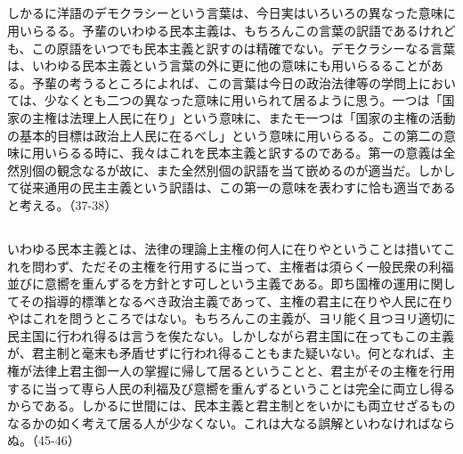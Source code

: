\subsection{}



しかるに洋語のデモクラシーという言葉は、今日実はいろいろの異なった意味に用いらるる。予輩のいわゆる民本主義は、もちろんこの言葉の訳語であるけれども、この原語をいつでも民本主義と訳すのは精確でない。デモクラシーなる言葉は、いわゆる民本主義という言葉の外に更に他の意味にも用いらるることがある。予輩の考うるところによれば、この言葉は今日の政治法律等の学問上においては、少なくとも二つの異なった意味に用いられて居るように思う。一つは「国家の主権は法理上人民に在り」という意味に、またモ一つは「国家の主権の活動の基本的目標は政治上人民に在るべし」という意味に用いらるる。この第二の意味に用いらるる時に、我々はこれを民本主義と訳するのである。第一の意義は全然別個の観念なるが故に、また全然別個の訳語を当て嵌めるのが適当だ。しかして従来通用の民主主義という訳語は、この第一の意味を表わすに恰も適当であると考える。（37-38）

\subsection{}

いわゆる民本主義とは、法律の理論上主権の何人に在りやということは措いてこれを問わず、ただその主権を行用するに当って、主権者は須らく一般民衆の利福並びに意嚮を重んずるを方針とす可しという主義である。即ち国権の運用に関してその指導的標準となるべき政治主義であって、主権の君主に在りや人民に在りやはこれを問うところではない。もちろんこの主義が、ヨリ能く且つヨリ適切に民主国に行われ得るは言うを俟たない。しかしながら君主国に在ってもこの主義が、君主制と毫末も矛盾せずに行われ得ることもまた疑いない。何となれば、主権が法律上君主御一人の掌握に帰して居るということと、君主がその主権を行用するに当って専ら人民の利福及び意嚮を重んずるということは完全に両立し得るからである。しかるに世間には、民本主義と君主制とをいかにも両立せざるものなるかの如く考えて居る人が少なくない。これは大なる誤解といわなければならぬ。（45-46）

\subsection{}

